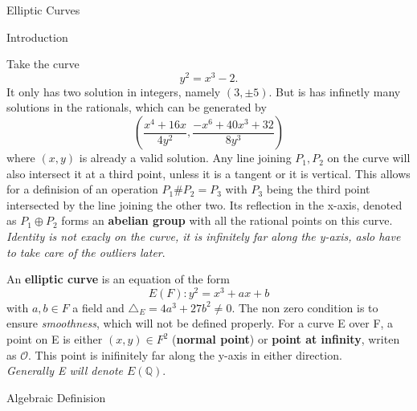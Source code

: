 \documentclass[12pt, letterpaper]{article}
\begin{document}
\begin{section}{Elliptic Curves}

  \begin{subsection}{Introduction}

    Take the curve \[y^{2} = x^{3} - 2.\] It only has two solution in integers,
    namely \((3, \pm 5)\). But is has infinetly many solutions in the
    rationals, which can be generated by
    \[(\frac{x^{4} + 16x}{4y^{2}}, \frac{-x^{6} + 40x^{3} + 32}{8y^{3}})\]
    where \((x, y)\) is already a valid solution. Any line joining \(P_{1},
    P_{2}\) on the curve will also intersect it at a third point, unless it
    is a tangent or it is vertical. This allows for a definision of an
    operation \(P_{1} \# P_{2} = P_{3}\) with \(P_{3}\) being the third point
    intersected by the line joining the other two. Its reflection in the
    x-axis, denoted as \(P_{1} \oplus P_{2}\) forms an \textbf{abelian group}
    with all the rational points on this curve. \textit{Identity is not exacly
      on the curve, it is infinitely far along the y-axis, aslo have to take
      care of the outliers later}.

    An \textbf{elliptic curve} is an equation of the form
    \[E(F): y^{2} = x^{3} + ax + b\] with \(a, b \in F\) a field and
    \(\triangle_{E} = 4a^{3} + 27b^{2} \neq 0\). The non zero condition is to
    ensure \textit{smoothness}, which will not be defined properly. For a
    curve E over F, a point on E is either \((x, y) \in F^{2}\)
    (\textbf{normal point}) or \textbf{point at infinity}, writen as
    \(\mathcal{O}\). This point is inifinitely far along the y-axis in either
    direction. \\
    \textit{Generally E will denote \(E(\mathbb{Q})\)}.

  \end{subsection}

  \begin{subsection}{Algebraic Definision}


\end{subsection}
\end{section}
\end{document}
